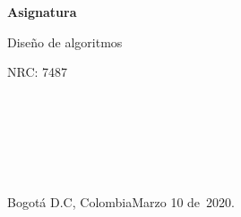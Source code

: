 \documentclass[12pt]{article}
\renewcommand{\_}{\kern-1.5pt\textunderscore\kern-1.5pt}
\begin{document}
\vspace{\baselineskip}

\vspace{\baselineskip}

\vspace{\baselineskip}

\vspace{\baselineskip}
\begin{Center}
{\fontsize{14pt}{16.8pt}\selectfont \textbf{Asignatura}\par}
\end{Center}\par

\begin{Center}
{\fontsize{14pt}{16.8pt}\selectfont Diseño de algoritmos\par}
\end{Center}\par


\vspace{\baselineskip}

\vspace{\baselineskip}

\vspace{\baselineskip}

\vspace{\baselineskip}
\begin{Center}
{\fontsize{14pt}{16.8pt}\selectfont NRC: 7487\\
\\
\\
\\
\par}
\end{Center}\par


\vspace{\baselineskip}

\vspace{\baselineskip}
\\
\\
{\fontsize{14pt}{16.8pt}\selectfont Bogotá D.C, Colombia\tab \tab \tab \tab \tab Marzo 10 de 2020.\par}\par


\vspace{\baselineskip}

\vspace{\baselineskip}

\vspace{\baselineskip}
\end{document}

